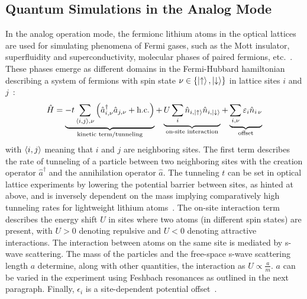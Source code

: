 \subsection*{Quantum Simulations in the Analog Mode}
In the analog operation mode, the fermionc lithium atoms in the optical lattices are used for simulating phenomena of Fermi gases, such as the Mott insulator, superfluidity and  superconductivity, molecular phases of paired fermions, etc.~\cite{bloch_quantum_2012}. These phases emerge as different domains in the Fermi-Hubbard hamiltonian describing a system of fermions with spin state $\nu \in \{\Ket{\uparrow}, \Ket{\downarrow}\}$ in lattice sites $i$ and $j$~\cite{hubbard_electron_1963,esslinger_fermi-hubbard_2010}:
\begin{align}\label{eq:fermi_hubbard_hamiltonian}
    \hat H =
    \underbrace{-t \sum\limits_{\Braket{i,j}, \nu} \left(\hat a^\dagger_{i, \nu} \hat a_{j, \nu} + \text{h.c.}\right)}_\text{kinetic term/tunneling}
    + \underbrace{U \sum\limits_i \hat n_{i, \Ket{\uparrow}} \hat n_{i, \Ket{\downarrow}}}_\text{on-site interaction}
    + \underbrace{\sum\limits_{i, \nu} \epsilon_{i} \hat n_{i\, \nu}}_\text{offset}
\end{align}
with $\Braket{i,j}$ meaning that $i$ and $j$ are neighboring sites. The first term describes the rate of tunneling of a particle between two neighboring sites with the creation operator $\hat a^\dagger$ and the annihilation operator $\hat a$. The tunneling $t$ can be set in optical lattice experiments by lowering the potential barrier between sites, as hinted at above, and is inversely dependent on the mass implying comparatively high tunneling rates for lightweight lithium atoms~\cite{hilker_spin-resolved_2017}. The on-site interaction term describes the energy shift $U$ in sites where two atoms (in different spin states) are present, with $U > 0$ denoting repulsive and $U < 0$ denoting attractive interactions. The interaction between atoms on the same site is mediated by s-wave scattering. The mass of the particles and the free-space s-wave scattering length $a$ determine, along with other quantities, the interaction as $U \propto \frac{a}{m}$. $a$ can be varied in the experiment using Feshbach resonances as outlined in the next paragraph. Finally, $\epsilon_i$ is a site-dependent potential offset~\cite{esslinger_fermi-hubbard_2010}.


